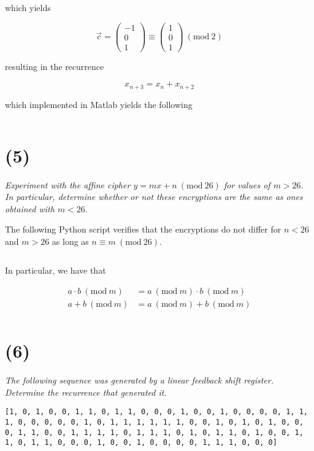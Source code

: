 \documentclass[12pt]{article}
\renewcommand{\mod}[1]{\mathrm{mod}\ #1}
\renewcommand{\pmod}[1]{\ (\mod{#1})}
\begin{document}
    which yields

    $$\vec{c} = \begin{pmatrix}-1 \\ 0 \\ 1\end{pmatrix} \equiv \begin{pmatrix}1 \\ 0 \\ 1\end{pmatrix} \pmod{2}$$

    resulting in the recurrence

    $$x_{n + 3} = x_n + x_{n + 2}$$

    which implemented in Matlab yields the following

    \inputminted{matlab}{../snippets/matlab/recurrence.m}

\section*{(5)} \textit{Experiment with the affine cipher $y = m x + n \pmod{26}$ for values of $m > 26$. In particular, determine whether or not these encryptions are the same as ones obtained with $m < 26$.}

    The following Python script verifies that the encryptions do not differ for $n < 26$ and $m > 26$ as long as $n \equiv m \pmod{26}$.

    \inputminted{python}{hw1_affine.py}

    In particular, we have that

    \begin{align*}
        a \cdot b \pmod{m} &= a \pmod{m} \cdot b \pmod{m}\\
        a + b \pmod{m} &= a \pmod{m} + b \pmod{m}\\
    \end{align*}

\section*{(6)} \textit{The following sequence was generated by a linear feedback shift register. Determine the recurrence that generated it.}

    \texttt{[1, 0, 1, 0, 0, 1, 1, 0, 1, 1, 0, 0, 0, 1, 0, 0, 1, 0, 0, 0, 0, 1, 1,
    1, 0, 0, 0, 0, 0, 1, 0, 1, 1, 1, 1, 1, 1, 0, 0, 1, 0, 1, 0, 1, 0, 0,
    0, 1, 1, 0, 0, 1, 1, 1, 1, 0, 1, 1, 1, 0, 1, 0, 1, 1, 0, 1, 0, 0, 1,
    1, 0, 1, 1, 0, 0, 0, 1, 0, 0, 1, 0, 0, 0, 0, 1, 1, 1, 0, 0, 0]}
\end{document}
